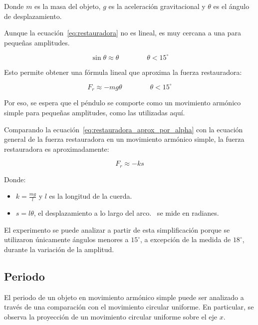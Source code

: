 \documentclass[twocolumn]{report}
\numberwithin{table}{section}
\begin{document}
Donde $m$ es la masa del objeto, $g$ es la aceleración gravitacional y $\theta$
es el ángulo de desplazamiento.

Aunque la ecuación~\eqref{eq:restauradora} no es lineal, es muy cercana
a una para pequeñas amplitudes.

\begin{equation*}
  \sin{\theta} \approx \theta \qquad\qquad \theta < 15^{\circ}
\end{equation*}

Esto permite obtener una fórmula lineal que aproxima la fuerza restauradora:

\begin{equation}\label{eq:restauradora_aprox_por_alpha}
  F_{r} \approx -mg\theta \qquad\qquad \theta < 15^{\circ}
\end{equation}

Por eso, se espera que el péndulo se comporte como un movimiento
armónico simple para pequeñas amplitudes, como las utilizadas aquí.

Comparando la ecuación~\eqref{eq:restauradora_aprox_por_alpha} con la
ecuación general de la fuerza restauradora en un movimiento armónico
simple, la fuerza restauradora es aproximadamente:

\begin{equation}\label{eq:restauradora_mas}
  F_{r} \approx -ks
\end{equation}

Donde:

\begin{itemize}
  \item $k = \frac{mg}{l}$ y $l$ es la longitud de la cuerda.
  \item $s = l\theta$, el desplazamiento a lo largo del
    arco.\ \theta{} se mide en radianes.
\end{itemize}

El experimento se puede analizar a partir de esta simplificación
porque se utilizaron únicamente ángulos menores a $15^{\circ}$, a
excepción de la medida de $18^{\circ}$, durante la variación de la amplitud.

\subsection{Periodo}

El periodo de un objeto en movimiento armónico simple puede ser
analizado a través de una comparación con el movimiento circular
uniforme. En particular, se observa la proyección de un movimiento
circular uniforme sobre el eje $x$.
\end{document}
